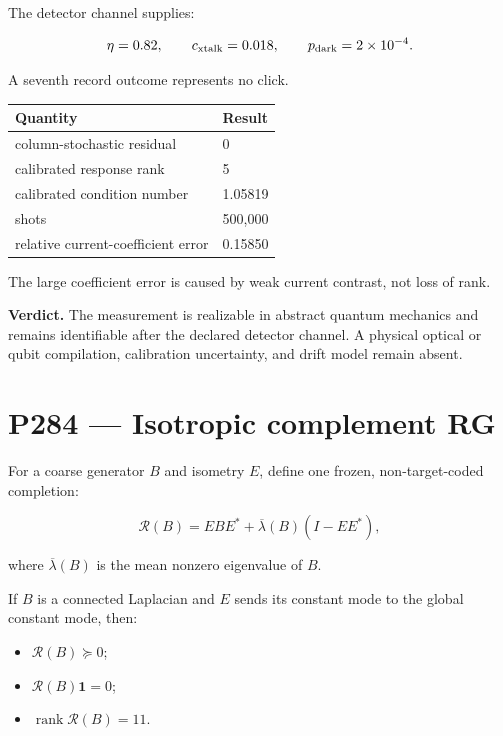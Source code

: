 \documentclass[11pt,a4paper,openany]{report}
\begin{document}
The detector channel supplies:

\[
\eta=0.82,\qquad
c_{\rm xtalk}=0.018,\qquad
p_{\rm dark}=2\times10^{-4}.
\]

A seventh record outcome represents no click.

\begin{center}
\begingroup\small
\setlength{\tabcolsep}{2.5pt}
\renewcommand{\arraystretch}{1.16}
\begin{longtable}{@{}p{}p{}@{}}
\toprule
\textbf{Quantity} & \textbf{Result} \\
\midrule
\endhead
column-stochastic residual & 0 \\
calibrated response rank & 5 \\
calibrated condition number & 1.05819 \\
shots & 500,000 \\
relative current-coefficient error & 0.15850 \\
\bottomrule
\end{longtable}
\endgroup
\end{center}

The large coefficient error is caused by weak current contrast, not loss of rank.

\textbf{Verdict.} The measurement is realizable in abstract quantum mechanics and remains identifiable after the declared detector channel. A physical optical or qubit compilation, calibration uncertainty, and drift model remain absent.

\chapter{P284 --- Isotropic complement RG}

For a coarse generator \(B\) and isometry \(E\), define one frozen, non-target-coded completion:

\[
\mathcal R(B)
=
EBE^\ast
+
\overline\lambda(B)(I-EE^\ast),
\]

where \(\overline\lambda(B)\) is the mean nonzero eigenvalue of \(B\).

If \(B\) is a connected Laplacian and \(E\) sends its constant mode to the global constant mode, then:

\begin{itemize}
\item 
\(\mathcal R(B)\succeq0\);

\item 
\(\mathcal R(B)\mathbf1=0\);

\item 
\(\operatorname{rank}\mathcal R(B)=11\).

\end{itemize}
\end{document}
